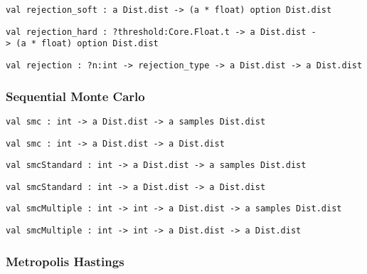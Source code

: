 \protect\hyperlink{val-rejectionux5fsoft}{}\texttt{val\ rejection\_soft\ :\ \textquotesingle{}a\ Dist.dist\ -\textgreater{}\ (\textquotesingle{}a\ *\ float)\ option\ Dist.dist}

\protect\hyperlink{val-rejectionux5fhard}{}\texttt{val\ rejection\_hard\ :\ ?⁠threshold:Core.Float.t\ -\textgreater{}\ \textquotesingle{}a\ Dist.dist\ -\textgreater{}\ (\textquotesingle{}a\ *\ float)\ option\ Dist.dist}

\protect\hyperlink{val-rejection}{}\texttt{val\ rejection\ :\ ?⁠n:int\ -\textgreater{}\ rejection\_type\ -\textgreater{}\ \textquotesingle{}a\ Dist.dist\ -\textgreater{}\ \textquotesingle{}a\ Dist.dist}

\hypertarget{infux5fsmc}{\subsubsection{\texorpdfstring{\protect\hyperlink{infux5fsmc}{}Sequential
Monte Carlo}{Sequential Monte Carlo}}\label{infux5fsmc}}

\protect\hyperlink{val-smc}{}\texttt{val\ smc\ :\ int\ -\textgreater{}\ \textquotesingle{}a\ Dist.dist\ -\textgreater{}\ \textquotesingle{}a\ samples\ Dist.dist}

\protect\hyperlink{val-smcux27}{}\texttt{val\ smc\textquotesingle{}\ :\ int\ -\textgreater{}\ \textquotesingle{}a\ Dist.dist\ -\textgreater{}\ \textquotesingle{}a\ Dist.dist}

\protect\hyperlink{val-smcStandard}{}\texttt{val\ smcStandard\ :\ int\ -\textgreater{}\ \textquotesingle{}a\ Dist.dist\ -\textgreater{}\ \textquotesingle{}a\ samples\ Dist.dist}

\protect\hyperlink{val-smcStandardux27}{}\texttt{val\ smcStandard\textquotesingle{}\ :\ int\ -\textgreater{}\ \textquotesingle{}a\ Dist.dist\ -\textgreater{}\ \textquotesingle{}a\ Dist.dist}

\protect\hyperlink{val-smcMultiple}{}\texttt{val\ smcMultiple\ :\ int\ -\textgreater{}\ int\ -\textgreater{}\ \textquotesingle{}a\ Dist.dist\ -\textgreater{}\ \textquotesingle{}a\ samples\ Dist.dist}

\protect\hyperlink{val-smcMultipleux27}{}\texttt{val\ smcMultiple\textquotesingle{}\ :\ int\ -\textgreater{}\ int\ -\textgreater{}\ \textquotesingle{}a\ Dist.dist\ -\textgreater{}\ \textquotesingle{}a\ Dist.dist}

\hypertarget{infux5fmh}{\subsubsection{\texorpdfstring{\protect\hyperlink{infux5fmh}{}Metropolis
Hastings}{Metropolis Hastings}}\label{infux5fmh}}

